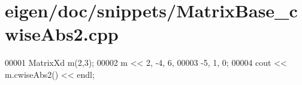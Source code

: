 \hypertarget{eigen_2doc_2snippets_2_matrix_base__cwise_abs2_8cpp_source}{}\section{eigen/doc/snippets/\+Matrix\+Base\+\_\+cwise\+Abs2.cpp}
\label{eigen_2doc_2snippets_2_matrix_base__cwise_abs2_8cpp_source}

\begin{DoxyCode}
00001 MatrixXd m(2,3);
00002 m << 2, -4, 6,   
00003      -5, 1, 0;
00004 cout << m.cwiseAbs2() << endl;
\end{DoxyCode}
